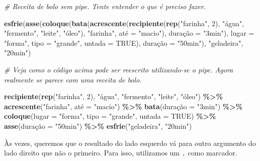 \documentclass[
]{book}
\newenvironment{Shaded}{\begin{snugshade}}{\end{snugshade}}
\newcommand{\CommentTok}[1]{\textcolor[rgb]{0.56,0.35,0.01}{\textit{#1}}}
\newcommand{\DataTypeTok}[1]{\textcolor[rgb]{0.13,0.29,0.53}{#1}}
\newcommand{\DecValTok}[1]{\textcolor[rgb]{0.00,0.00,0.81}{#1}}
\newcommand{\KeywordTok}[1]{\textcolor[rgb]{0.13,0.29,0.53}{\textbf{#1}}}
\newcommand{\NormalTok}[1]{#1}
\newcommand{\OperatorTok}[1]{\textcolor[rgb]{0.81,0.36,0.00}{\textbf{#1}}}
\newcommand{\OtherTok}[1]{\textcolor[rgb]{0.56,0.35,0.01}{#1}}
\newcommand{\StringTok}[1]{\textcolor[rgb]{0.31,0.60,0.02}{#1}}
\begin{document}
\begin{Shaded}
\begin{Highlighting}[]
\CommentTok{\# Receita de bolo sem pipe. Tente entender o que é preciso fazer.}

\KeywordTok{esfrie}\NormalTok{(}\KeywordTok{asse}\NormalTok{(}\KeywordTok{coloque}\NormalTok{(}\KeywordTok{bata}\NormalTok{(}\KeywordTok{acrescente}\NormalTok{(}\KeywordTok{recipiente}\NormalTok{(}\KeywordTok{rep}\NormalTok{(}\StringTok{"farinha"}\NormalTok{, }\DecValTok{2}\NormalTok{), }\StringTok{"água"}\NormalTok{, }\StringTok{"fermento"}\NormalTok{, }\StringTok{"leite"}\NormalTok{, }\StringTok{"óleo"}\NormalTok{), }\StringTok{"farinha"}\NormalTok{, até =}\StringTok{ "macio"}\NormalTok{), duração =}\StringTok{ "3min"}\NormalTok{), }\DataTypeTok{lugar =} \StringTok{"forma"}\NormalTok{, }\DataTypeTok{tipo =} \StringTok{"grande"}\NormalTok{, }\DataTypeTok{untada =} \OtherTok{TRUE}\NormalTok{), duração =}\StringTok{ "50min"}\NormalTok{), }\StringTok{"geladeira"}\NormalTok{, }\StringTok{"20min"}\NormalTok{)}


\CommentTok{\# Veja como o código acima pode ser reescrito utilizando{-}se o pipe. Agora realmente se parece com uma receita de bolo.}

\KeywordTok{recipiente}\NormalTok{(}\KeywordTok{rep}\NormalTok{(}\StringTok{"farinha"}\NormalTok{, }\DecValTok{2}\NormalTok{), }\StringTok{"água"}\NormalTok{, }\StringTok{"fermento"}\NormalTok{, }\StringTok{"leite"}\NormalTok{, }\StringTok{"óleo"}\NormalTok{) }\OperatorTok{\%>\%}
\StringTok{  }\KeywordTok{acrescente}\NormalTok{(}\StringTok{"farinha"}\NormalTok{, até =}\StringTok{ "macio"}\NormalTok{) }\OperatorTok{\%>\%}
\StringTok{  }\KeywordTok{bata}\NormalTok{(duração =}\StringTok{ "3min"}\NormalTok{) }\OperatorTok{\%>\%}
\StringTok{  }\KeywordTok{coloque}\NormalTok{(}\DataTypeTok{lugar =} \StringTok{"forma"}\NormalTok{, }\DataTypeTok{tipo =} \StringTok{"grande"}\NormalTok{, }\DataTypeTok{untada =} \OtherTok{TRUE}\NormalTok{) }\OperatorTok{\%>\%}
\StringTok{  }\KeywordTok{asse}\NormalTok{(duração =}\StringTok{ "50min"}\NormalTok{) }\OperatorTok{\%>\%}
\StringTok{  }\KeywordTok{esfrie}\NormalTok{(}\StringTok{"geladeira"}\NormalTok{, }\StringTok{"20min"}\NormalTok{)}
\end{Highlighting}
\end{Shaded}

Às vezes, queremos que o resultado do lado esquerdo vá para outro argumento do lado direito que não o primeiro. Para isso, utilizamos um \texttt{.} como marcador.
\end{document}
